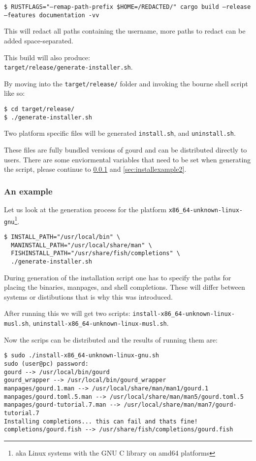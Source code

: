 \texttt{\$ RUSTFLAGS="--remap-path-prefix \$HOME=/REDACTED/" cargo build --release --features documentation -vv}

This will redact all paths containing the username, more paths to redact can be added space-separated.

This build will also produce: \\
\texttt{target/release/generate-installer.sh}.

By moving into the \texttt{target/release/} folder and invoking the bourne shell script like so:

\begin{verbatim}
$ cd target/release/
$ ./generate-installer.sh
\end{verbatim}

Two platform specific files will be generated \texttt{install.sh}, and \texttt{uninstall.sh}.

These files are fully bundled versions of gourd and can be distributed directly to users.
There are some enviormental variables that need to be set when generating the script,
please continue to \ref{sec:installexample1} and \ref{sec:installexample2}.

\subsubsection{An example}
\label{sec:installexample1}

Let us look at the generation process for the platform \texttt{x86\_64-unknown-linux-gnu}\footnote{aka Linux systems with the GNU C library on amd64 platforms}.

\begin{verbatim}
$ INSTALL_PATH="/usr/local/bin" \
  MANINSTALL_PATH="/usr/local/share/man" \
  FISHINSTALL_PATH="/usr/share/fish/completions" \
  ./generate-installer.sh
\end{verbatim}

During generation of the installation script one has to specify the paths for placing the binaries, manpages, and shell completions.
These will differ between systems or distibutions that is why this was introduced.

After running this we will get two scripts: \texttt{install-x86\_64-unknown-linux-musl.sh}, \texttt{uninstall-x86\_64-unknown-linux-musl.sh}.

Now the scrips can be distributed and the results of running them are:

\begin{verbatim}
$ sudo ./install-x86_64-unknown-linux-gnu.sh
sudo (user@pc) password:
gourd --> /usr/local/bin/gourd
gourd_wrapper --> /usr/local/bin/gourd_wrapper
manpages/gourd.1.man --> /usr/local/share/man/man1/gourd.1
manpages/gourd.toml.5.man --> /usr/local/share/man/man5/gourd.toml.5
manpages/gourd-tutorial.7.man --> /usr/local/share/man/man7/gourd-tutorial.7
Installing completions... this can fail and thats fine!
completions/gourd.fish --> /usr/share/fish/completions/gourd.fish
\end{verbatim}

